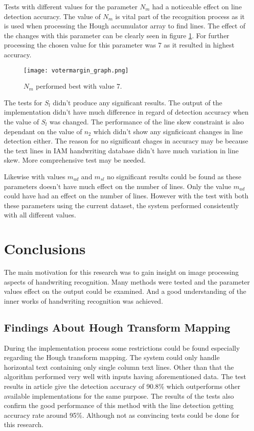 \documentclass{article}
\begin{document}
    Tests with different values for the parameter $N_m$ had a noticeable effect on line detection accuracy. The value of $N_m$ is vital part of the recognition process as it is used when processing the Hough accumulator array to find lines. The effect of the changes with this parameter can be clearly seen in figure \ref{fig:votermargin}. For further processing the chosen value for this parameter was 7 as it resulted in highest accuracy.

    \begin{figure}[!ht]
      \centering
      \texttt{[image: votermargin\_graph.png]}
      \caption{$N_m$ performed best with value 7.
      \label{fig:votermargin}}
    \end{figure}

    The tests for $S_l$ didn't produce any significant results. The output of the implementation didn't have much difference in regard of detection accuracy when the value of $S_l$ was changed. The performance of the line skew constraint is also dependant on the value of $n_2$ which didn't show any signficicant changes in line detection either. The reason for no significant chages in accuracy may be because the text lines in IAM handwriting database didn't have much variation in line skew. More comprehensive test may be needed.

    Likewise with values $m_{ad}$ and $m_{sl}$ no significant results could be found as these parameters doesn't have much effect on the number of lines. Only the value $m_{ad}$ could have had an effect on the number of lines. However with the test with both these parameters using the current dataset, the system performed consistently with all different values.

  \newpage
  \section{Conclusions}
    The main motivation for this research was to gain insight on image processing aspects of handwriting recognition. Many methods were tested and the parameter values effect on the output could be examined. And a good understanding of the inner works of handwriting recognition was achieved.

    \subsection{Findings About Hough Transform Mapping}
      During the implementation process some restrictions could be found especially regarding the Hough transform mapping. The system could only handle horizontal text containing only single column text lines. Other than that the algorithm performed very well with inputs having aforementioned data. The test results in article \cite{Louloudis2} give the detection accuracy of 90.8\% which outperforms other available implementations for the same purpose. The results of the tests also confirm the good performance of this method with the line detection getting accuracy rate around 95\%. Although not as convincing tests could be done for this research.
\end{document}
